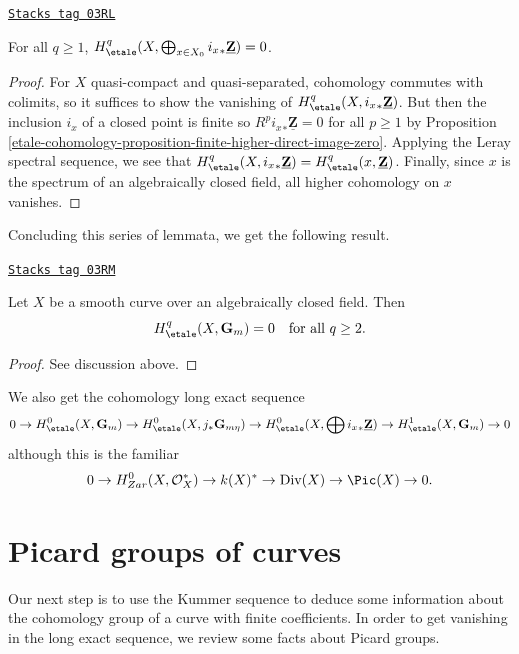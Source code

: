 \begin{lemma}
\label{etale-cohomology-lemma-cohomology-istar-Z}
\href{https://stacks.math.columbia.edu/tag/03RL}{\texttt{Stacks tag 03RL}}

For all $q \geq 1$, $H_\etale^q(X, \bigoplus_{x \in X_0} {i_x}_*
\underline{\mathbf{Z}}) = 0$.
\end{lemma}

\begin{proof}
For $X$ quasi-compact and quasi-separated, cohomology commutes with colimits,
so it suffices to show the vanishing of $H_\etale^q(X, {i_x}_*
\underline{\mathbf{Z}})$. But then the inclusion $i_x$ of a closed point is
finite so $R^p {i_x}_* \underline{\mathbf{Z}} = 0$ for all $p \geq 1$ by
Proposition \ref{etale-cohomology-proposition-finite-higher-direct-image-zero}.
Applying the Leray spectral sequence, we see that
$H_\etale^q(X, {i_x}_* \underline{\mathbf{Z}}) =
H_\etale^q(x, \underline{\mathbf{Z}})$.
Finally, since $x$ is the spectrum of an
algebraically closed field, all higher cohomology on $x$ vanishes.
\end{proof}

Concluding this series of lemmata, we get the following result.

\begin{theorem}
\label{etale-cohomology-theorem-vanishing-cohomology-Gm-curve}
\href{https://stacks.math.columbia.edu/tag/03RM}{\texttt{Stacks tag 03RM}}

Let $X$ be a smooth curve over an algebraically closed field. Then
$$
H_\etale^q(X, \mathbf{G}_m) = 0 \ \ \text{ for all } q \geq 2.
$$
\end{theorem}

\begin{proof}
See discussion above.
\end{proof}

We also get the cohomology long exact sequence
$$
0 \to
H_\etale^0(X, \mathbf{G}_m) \to
H_\etale^0(X, j_*\mathbf{G}_{m\eta}) \to
H_\etale^0(X, \bigoplus {i_x}_*\underline{\mathbf{Z}}) \to
H_\etale^1(X, \mathbf{G}_m) \to 0
$$
although this is the familiar
$$
0 \to H_{Zar}^0(X, \mathcal{O}_X^*) \to k(X)^* \to \text{Div}(X)
\to \Pic(X) \to 0.
$$

\section{Picard groups of curves}
\label{etale-cohomology-section-pic-curves}
Our next step is to use the Kummer sequence to deduce some information
about the cohomology group of a curve with finite coefficients. In order
to get vanishing in the long exact sequence, we review some facts about
Picard groups.

